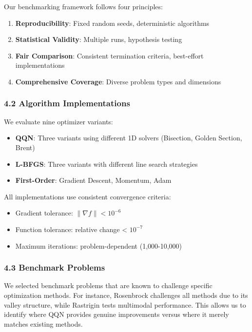 Our benchmarking framework follows four principles:

\begin{enumerate}
\def\labelenumi{\arabic{enumi}.}
\tightlist
\item
  \textbf{Reproducibility}: Fixed random seeds, deterministic algorithms
\item
  \textbf{Statistical Validity}: Multiple runs, hypothesis testing
\item
  \textbf{Fair Comparison}: Consistent termination criteria, best-effort implementations
\item
  \textbf{Comprehensive Coverage}: Diverse problem types and dimensions
\end{enumerate}

\hypertarget{algorithm-implementations}{%
\subsubsection{4.2 Algorithm Implementations}\label{algorithm-implementations}}

We evaluate nine optimizer variants:

\begin{itemize}
\tightlist
\item
  \textbf{QQN}: Three variants using different 1D solvers (Bisection, Golden Section, Brent)
\item
  \textbf{L-BFGS}: Three variants with different line search strategies
\item
  \textbf{First-Order}: Gradient Descent, Momentum, Adam
\end{itemize}

All implementations use consistent convergence criteria:

\begin{itemize}
\tightlist
\item
  Gradient tolerance: \(\|\nabla f\| < 10^{-6}\)
\item
  Function tolerance: relative change \textless{} \(10^{-7}\)
\item
  Maximum iterations: problem-dependent (1,000-10,000)
\end{itemize}

\hypertarget{benchmark-problems}{%
\subsubsection{4.3 Benchmark Problems}\label{benchmark-problems}}

We selected benchmark problems that are known to challenge specific optimization methods. For instance, Rosenbrock challenges all methods due to its valley structure, while Rastrigin tests multimodal performance. This allows us to identify where QQN provides genuine improvements versus where it merely matches existing methods.

